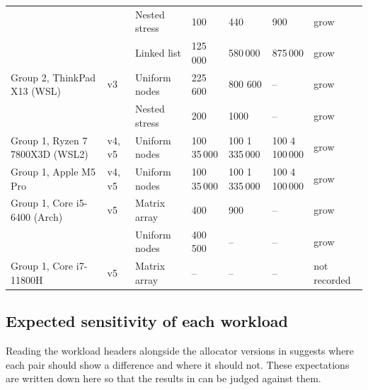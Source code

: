 \begin{table}[!t]
\begin{tabularx}{\textwidth}{@{}l l l L L L l@{}}
 & & Nested stress & 100 & 440 & 900 & grow \\
 & & Linked list & 125\,000 & 580\,000 & 875\,000 & grow \\
Group 2, ThinkPad X13 (WSL) & v3 & Uniform nodes & 225 600 & 800 600 & -- & grow \\
 & & Nested stress & 200 & 1000 & -- & grow \\
Group 1, Ryzen 7 7800X3D (WSL2) & v4, v5 & Uniform nodes & 100 35\,000 & 100 1\,335\,000 & 100 4\,100\,000 & grow \\
Group 1, Apple M5 Pro & v4, v5 & Uniform nodes & 100 35\,000 & 100 1\,335\,000 & 100 4\,100\,000 & grow \\
Group 1, Core i5-6400 (Arch) & v5 & Matrix array & 400 & 900 & -- & grow \\
 & & Uniform nodes & 400 500 & -- & -- & grow \\
Group 1, Core i7-11800H & v5 & Matrix array & -- & -- & -- & not recorded \\
\bottomrule
\end{tabularx}
\end{table}

\subsection{Expected sensitivity of each workload}

Reading the workload headers alongside the allocator versions in
 suggests where each pair should show a
difference and where it should not.
These expectations are written down here so that the results in
 can be judged against
them.

